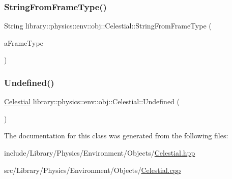 \subsubsection{\texorpdfstring{String\+From\+Frame\+Type()}{StringFromFrameType()}}
{\footnotesize\ttfamily String library\+::physics\+::env\+::obj\+::\+Celestial\+::\+String\+From\+Frame\+Type (\begin{DoxyParamCaption}\item[{const \hyperlink{classlibrary_1_1physics_1_1env_1_1obj_1_1_celestial_a8585fb32125cb6c73ae1339a5ea09c79}{Celestial\+::\+Frame\+Type} \&}]{a\+Frame\+Type }\end{DoxyParamCaption})\hspace{0.3cm}{\ttfamily [static]}}

\mbox{\label{classlibrary_1_1physics_1_1env_1_1obj_1_1_celestial_a5e33230d05d77f5e1132151ecf5e94e9}} 
\subsubsection{\texorpdfstring{Undefined()}{Undefined()}}
{\footnotesize\ttfamily \hyperlink{classlibrary_1_1physics_1_1env_1_1obj_1_1_celestial}{Celestial} library\+::physics\+::env\+::obj\+::\+Celestial\+::\+Undefined (\begin{DoxyParamCaption}{ }\end{DoxyParamCaption})\hspace{0.3cm}{\ttfamily [static]}}



The documentation for this class was generated from the following files\+:\begin{DoxyCompactItemize}
\item 
include/\+Library/\+Physics/\+Environment/\+Objects/\hyperlink{_celestial_8hpp}{Celestial.\+hpp}\item 
src/\+Library/\+Physics/\+Environment/\+Objects/\hyperlink{_celestial_8cpp}{Celestial.\+cpp}\end{DoxyCompactItemize}
